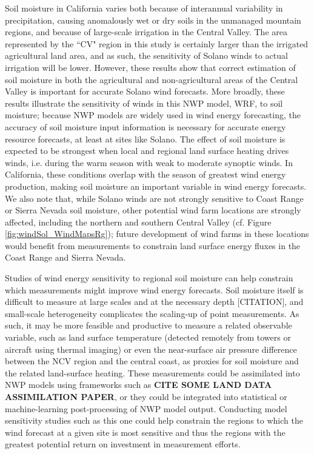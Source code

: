 Soil moisture in California varies both because of interannual variability in precipitation, causing anomalously wet or dry soils in the unmanaged mountain regions, and because of large-scale irrigation in the Central Valley.  The area represented by the ``CV" region in this study is certainly larger than the irrigated agricultural land area, and as such, the sensitivity of Solano winds to actual irrigation will be lower.  However, these results show that correct estimation of soil moisture in both the agricultural and non-agricultural areas of the Central Valley is important for accurate Solano wind forecasts.  More broadly, these results illustrate the sensitivity of winds in this NWP model, WRF, to soil moisture; because NWP models are widely used in wind energy forecasting, the accuracy of soil moisture input information is necessary for accurate energy resource forecasts, at least at sites like Solano.  The effect of soil moisture is expected to be strongest when local and regional land surface heating drives winds, i.e. during the warm season with weak to moderate synoptic winds.  In California, these conditions overlap with the season of greatest wind energy production, making soil moisture an important variable in wind energy forecasts.  We also note that, while Solano winds are not strongly sensitive to Coast Range or Sierra Nevada soil moisture, other potential wind farm locations are strongly affected, including the northern and southern Central Valley (cf. Figure \ref{fig:windSol_WindMapsRg}); future development of wind farms in these locations would benefit from measurements to constrain land surface energy fluxes in the Coast Range and Sierra Nevada.

Studies of wind energy sensitivity to regional soil moisture can help constrain which measurements might improve wind energy forecasts.  Soil moisture itself is difficult to measure at large scales and at the necessary depth [CITATION], and small-scale heterogeneity complicates the scaling-up of point measurements.  As such, it may be more feasible and productive to measure a related observable variable, such as land surface temperature (detected remotely from towers or aircraft using thermal imaging) or even the near-surface air pressure difference between the NCV region and the central coast, as proxies for soil moisture and the related land-surface heating.  These measurements could be assimilated into NWP models using frameworks such as \textbf{CITE SOME LAND DATA ASSIMILATION PAPER}, or they could be integrated into statistical or machine-learning post-processing of NWP model output.  Conducting model sensitivity studies such as this one could help constrain the regions to which the wind forecast at a given site is most sensitive and thus the regions with the greatest potential return on investment in measurement efforts.

